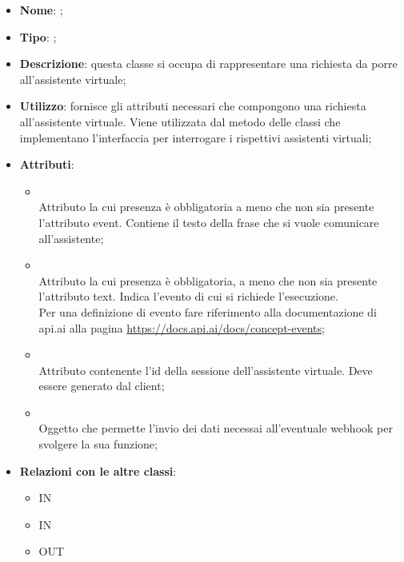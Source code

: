 \begin{itemize}
	\item \textbf{Nome}: ;
	\item \textbf{Tipo}: ;
	\item \textbf{Descrizione}: questa classe si occupa di rappresentare una richiesta da porre all'assistente virtuale;
	\item \textbf{Utilizzo}: fornisce gli attributi necessari che compongono una richiesta all'assistente virtuale. Viene utilizzata dal metodo  delle classi che implementano l'interfaccia  per interrogare i rispettivi assistenti virtuali;
	\item \textbf{Attributi}:
	\begin{itemize}
		\item[]  \\
		Attributo la cui presenza è obbligatoria a meno che non sia presente l'attributo event. Contiene il testo della frase che si vuole comunicare all'assistente;
		\item[]  \\
		Attributo la cui presenza è obbligatoria, a meno che non sia presente l'attributo text. Indica l'evento di cui si richiede l'esecuzione. \\ Per una definizione di evento fare riferimento alla documentazione di api.ai alla pagina \url{https://docs.api.ai/docs/concept-events};
		\item[]  \\
		Attributo contenente l'id della sessione dell'assistente virtuale. Deve essere generato dal client;
		\item[]  \\
		Oggetto che permette l'invio dei dati necessai all'eventuale webhook per svolgere la sua funzione;
	\end{itemize}
	\item \textbf{Relazioni con le altre classi}:
	\begin{itemize}
		\item IN \hyperlink{<<interface>> VAModule_label}{}
		\item IN \hyperlink{ApiAiVAAdapter_label}{}
		\item OUT \hyperlink{VAEventObject_label}{}
	\end{itemize}
\end{itemize}
\FloatBarrier

